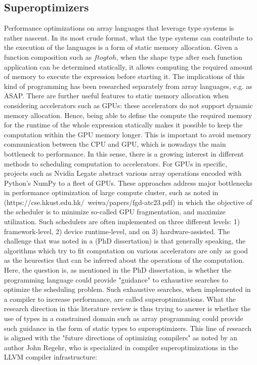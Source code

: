 \documentclass[10pt,a4paper]{article}
\begin{document}
\subsection{Superoptimizers}

Performance optimizations on array languages that leverage type systems is rather nascent.
In its most crude format, what the type systems can contribute to the execution of the languages is a form of static memory allocation.
Given a function composition such as $f to g to h$, when the shape type after each function application can be determined statically, it allows computing the required amount of memory to execute the expression before starting it.
The implications of this kind of programming has been researched separately from array languages, e.g. as ASAP.
There are further useful features to static memory allocation when considering accelerators such as GPUs: these accelerators do not support dynamic memory allocation.
Hence, being able to define the compute the required memory for the runtime of the whole expression statically makes it possible to keep the computation within the GPU memory longer.
This is important to avoid memory communication between the CPU and GPU, which is nowadays the main bottleneck to performance.
In this sense, there is a growing interest in different methods to scheduling computation to accelerators.
For GPUs in specific, projects such as Nvidia Legate abstract various array operations encoded with Python's NumPy to a fleet of GPUs.
These approaches address major bottlenecks in performance optimization of large compute cluster, such as noted in (https://cse.hkust.edu.hk/~weiwa/papers/fgd-atc23.pdf) in which the objective of the scheduler is to minimize so-called GPU fragmentation, and maximize utilization.
Such schedulers are often implemented on three different levels: 1) framework-level, 2) device runtime-level, and on 3) hardware-assisted.
The challenge that was noted in a (PhD dissertation) is that generally speaking, the algorithms which try to fit computation on various accelerators are only as good as the heurestics that can be inferred about the operations of the computation.
Here, the question is, as mentioned in the PhD dissertation, is whether the programming language could provide "guidance" to exhaustive searches to optimize the scheduling problem.
Such exhaustive searches, when implemented in a compiler to increase performance, are called superoptimizations.
What the research direction in this literature review is thus trying to answer is whether the use of types in a constrained domain such as array programming could provide such guidance in the form of static types to superoptimizers.
This line of research is aligned with the "future directions of optimizing compilers" as noted by an author John Regehr, who is specialized in compiler superoptimizations in the LLVM compiler infrastructure:
\end{document}
